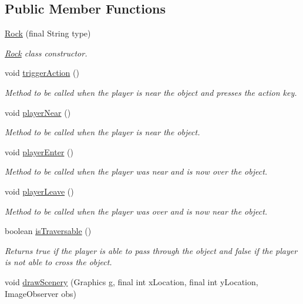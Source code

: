 \subsection*{Public Member Functions}
\begin{DoxyCompactItemize}
\item 
\hyperlink{a00022_aa6c5ea6a70562733bb684b70e9dcdf1d}{Rock} (final String type)
\begin{DoxyCompactList}\small\item\em \hyperlink{a00022}{Rock} class constructor. \end{DoxyCompactList}\item 
void \hyperlink{a00022_a44cae36b6160b445a8b76b108fcc0323}{trigger\-Action} ()
\begin{DoxyCompactList}\small\item\em Method to be called when the player is near the object and presses the action key. \end{DoxyCompactList}\item 
void \hyperlink{a00022_a10b048a09c4733da9ab3c902156f7d02}{player\-Near} ()
\begin{DoxyCompactList}\small\item\em Method to be called when the player is near the object. \end{DoxyCompactList}\item 
void \hyperlink{a00022_af334cebe76b712f9d93cdda4d23cd4c4}{player\-Enter} ()
\begin{DoxyCompactList}\small\item\em Method to be called when the player was near and is now over the object. \end{DoxyCompactList}\item 
void \hyperlink{a00022_a31f1aa4f4b21091140cf1c11c2ae21c1}{player\-Leave} ()
\begin{DoxyCompactList}\small\item\em Method to be called when the player was over and is now near the object. \end{DoxyCompactList}\item 
boolean \hyperlink{a00022_a9a626a55bb40a8937abb5049480a7ba9}{is\-Traversable} ()
\begin{DoxyCompactList}\small\item\em Returns true if the player is able to pass through the object and false if the player is not able to cross the object. \end{DoxyCompactList}\item 
void \hyperlink{a00024_a626c1ae7fa15d2f96d564c35368fdbc9}{draw\-Scenery} (Graphics g, final int x\-Location, final int y\-Location, Image\-Observer obs)
\end{DoxyCompactItemize}
